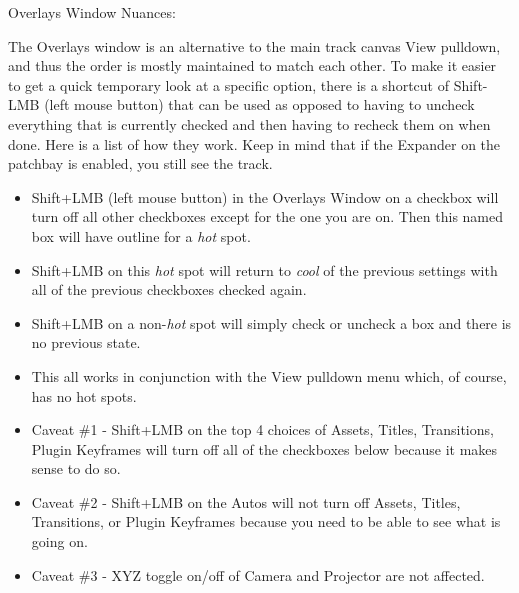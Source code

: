 Overlays Window Nuances:

The Overlays window is an alternative to the main track canvas View pulldown, and thus the order is mostly maintained to match each other.  
To make it easier to get a quick temporary look at a specific option, there is a shortcut of Shift-LMB (left mouse button) that can be used as opposed to having to uncheck everything that is currently checked and then having to recheck them on when done.  
Here is a list of how they work.  Keep in mind that if the Expander on the patchbay is enabled, you still see the track.

\begin{itemize}
    \item  Shift+LMB (left mouse button) in the Overlays Window on a checkbox will turn off all other
        checkboxes except for the one you are on.  Then this named box will have outline for a  \textit{hot} spot.
    \item  Shift+LMB on this \textit{hot} spot will return to \textit{cool} of the previous settings with all of the previous
        checkboxes checked again.
    \item  Shift+LMB on a non-\textit{hot} spot will simply check or uncheck a box and there is no previous state.
    \item This all works in conjunction with the View pulldown menu which, of course, has no hot spots.
    \item  Caveat \#1 - Shift+LMB on the top 4 choices of Assets, Titles, Transitions, Plugin Keyframes will turn
        off all of the checkboxes below because it makes sense to do so.
    \item  Caveat \#2 - Shift+LMB on the Autos will not turn off Assets, Titles, Transitions, or Plugin Keyframes
        because you need to be able to see what is going on.
        \item Caveat \#3 - XYZ toggle on/off of Camera and Projector are not affected.
\end{itemize}

